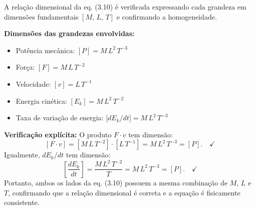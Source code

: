 A relação dimensional da eq. (3.10) é verificada expressando cada grandeza em dimensões fundamentais $[M,\,L,\,T]$ e confirmando a homogeneidade.

\textbf{Dimensões das grandezas envolvidas:}
\begin{itemize}
\item Potência mecânica: $[P] = M\,L^{2}\,T^{-3}$
\item Força: $[F] = M\,L\,T^{-2}$
\item Velocidade: $[v] = L\,T^{-1}$
\item Energia cinética: $[E_k] = M\,L^{2}\,T^{-2}$
\item Taxa de variação de energia: $\bigl[dE_k/dt\bigr] = M\,L^{2}\,T^{-3}$
\end{itemize}

\textbf{Verificação explícita:} O produto $F\cdot v$ tem dimensão:
\[
[F\cdot v] = [M\,L\,T^{-2}]\cdot[L\,T^{-1}] = M\,L^{2}\,T^{-3} = [P].\quad\checkmark
\]
Igualmente, $dE_k/dt$ tem dimensão:
\[
\left[\frac{dE_k}{dt}\right] = \frac{M\,L^{2}\,T^{-2}}{T} = M\,L^{2}\,T^{-3} = [P].\quad\checkmark
\]
Portanto, ambos os lados da eq. (3.10) possuem a mesma combinação de $M$, $L$ e $T$, confirmando que a relação dimensional é correta e a equação é fisicamente consistente.

